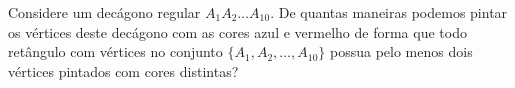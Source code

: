 Considere um decágono regular $A_1 A_2 \dots A_{10}$. De quantas maneiras podemos pintar os vértices deste decágono com as cores azul e vermelho de forma que todo retângulo com vértices no conjunto $\{A_1, A_2, \dots, A_{10}\}$ possua pelo menos dois vértices pintados com cores distintas?
